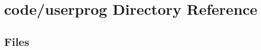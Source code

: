 \section{code/userprog Directory Reference}
\label{dir_bfb447c052bd4bcb95187cb1dcd3ae8f}
\subsection*{Files}
\begin{DoxyCompactItemize}
\end{DoxyCompactItemize}

